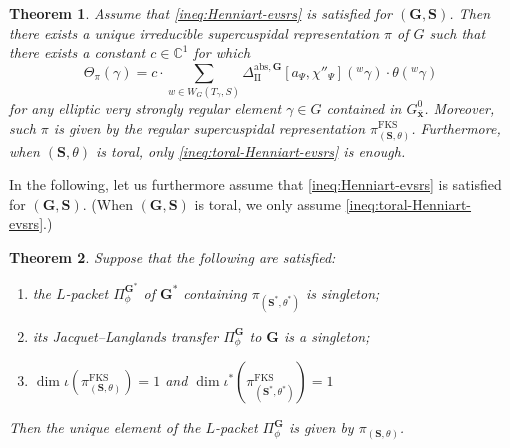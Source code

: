\documentclass{amsart}
\newcommand{\abs}{\mathrm{abs}}
\newcommand{\FKS}{\mathrm{FKS}}
\newcommand{\x}{\mathbf{x}}
\newcommand{\bbC}{\mathbb{C}}
\newcommand{\bfG}{\mathbf{G}}
\newcommand{\bfS}{\mathbf{S}}
\newcommand{\II}{\mathrm{II}}
\theoremstyle{plain}
\newtheorem{thm}{Theorem}[section]
\newtheorem{theorem}[thm]{Theorem}
\theoremstyle{definition}
\theoremstyle{remark}
\theoremstyle{theorem}
\begin{document}
\begin{theorem}\label{thm:regsc-characterization-evsrs}
Assume that \eqref{ineq:Henniart-evsrs} is satisfied for $(\bfG,\bfS)$. 
Then there exists a unique irreducible supercuspidal representation $\pi$ of $G$ such that there exists a constant $c \in \bbC^1$ for which
\[
\Theta_{\pi}(\gamma)
=
c\cdot
\sum_{w\in W_{G}(T_{\gamma},S)}\Delta_{\II}^{\abs,\bfG}[a_{\Psi},\chi''_{\Psi}]({}^{w}\gamma)\cdot\theta({}^{w}\gamma)
\]
for any elliptic very strongly regular element $\gamma\in G$ contained in $G^{0}_{\bar{\x}}$.
Moreover, such $\pi$ is given by the regular supercuspidal representation $\pi_{(\bfS, \theta)}^{\FKS}$.
Furthermore, when $(\bfS,\theta)$ is toral, only \eqref{ineq:toral-Henniart-evsrs} is enough.
\end{theorem}

In the following, let us furthermore assume that \eqref{ineq:Henniart-evsrs} is satisfied for $(\bfG,\bfS)$.
(When $(\bfG,\bfS)$ is toral, we only assume \eqref{ineq:toral-Henniart-evsrs}.)

\begin{thm}\label{thm:LJLC}
Suppose that the following are satisfied:
\begin{enumerate}
\item
the $L$-packet $\Pi^{\bfG^{\ast}}_{\phi}$ of $\bfG^{\ast}$ containing $\pi_{(\bfS^{\ast},\theta^{\ast})}$ is singleton;
\item
its Jacquet--Langlands transfer $\Pi^{\bfG}_{\phi}$ to $\bfG$ is a singleton;
\item
$\dim\iota(\pi^{\FKS}_{(\bfS,\theta)})=1$ and $\dim\iota^{\ast}(\pi^{\FKS}_{(\bfS^{\ast},\theta^{\ast})})=1$
\end{enumerate}
Then the unique element of the $L$-packet $\Pi^{\bfG}_{\phi}$ is given by $\pi_{(\bfS,\theta)}$.
\end{thm}
\end{document}
